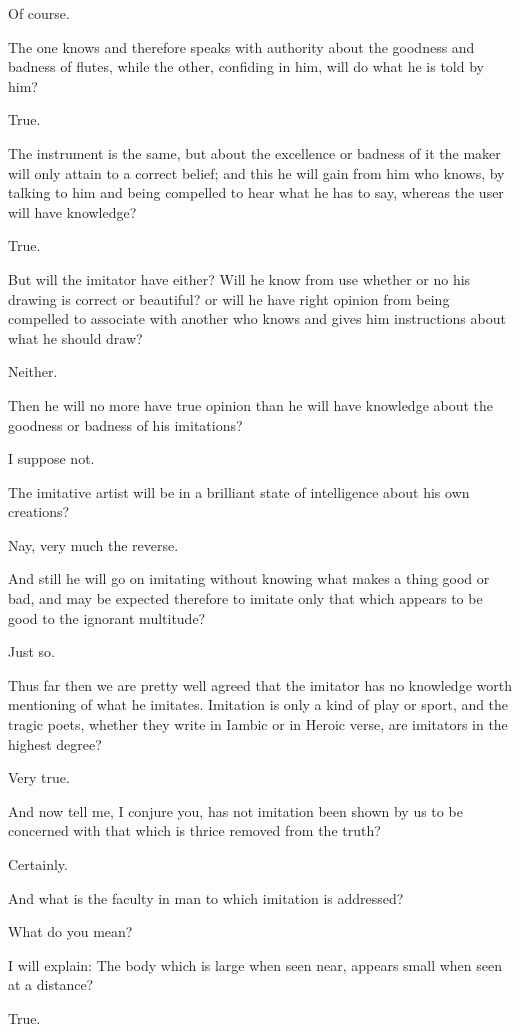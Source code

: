 Of course.

The one knows and therefore speaks with authority about the goodness and
badness of flutes, while the other, confiding in him, will do what he is
told by him?

True.

The instrument is the same, but about the excellence or badness of it
the maker will only attain to a correct belief; and this he will gain
from him who knows, by talking to him and being compelled to hear what
he has to say, whereas the user will have knowledge?

True.

But will the imitator have either? Will he know from use whether or no
his drawing is correct or beautiful? or will he have right opinion
from being compelled to associate with another who knows and gives him
instructions about what he should draw?

Neither.

Then he will no more have true opinion than he will have knowledge about
the goodness or badness of his imitations?

I suppose not.

The imitative artist will be in a brilliant state of intelligence about
his own creations?

Nay, very much the reverse.

And still he will go on imitating without knowing what makes a thing
good or bad, and may be expected therefore to imitate only that which
appears to be good to the ignorant multitude?

Just so.

Thus far then we are pretty well agreed that the imitator has no
knowledge worth mentioning of what he imitates. Imitation is only a kind
of play or sport, and the tragic poets, whether they write in Iambic or
in Heroic verse, are imitators in the highest degree?

Very true.

And now tell me, I conjure you, has not imitation been shown by us to be
concerned with that which is thrice removed from the truth?

Certainly.

And what is the faculty in man to which imitation is addressed?

What do you mean?

I will explain: The body which is large when seen near, appears small
when seen at a distance?

True.

